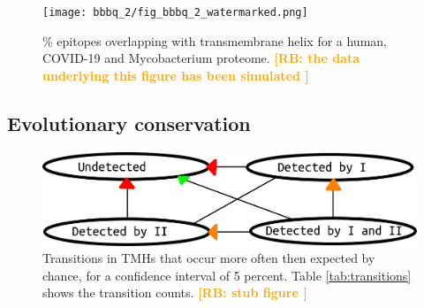 \documentclass{article}
\newcommand{\richel}[1]{\textcolor{orange}{\textbf{[RB: #1]}}}
\begin{document}
\begin{figure}[!htbp]
  \texttt{[image: bbbq\_2/fig\_bbbq\_2\_watermarked.png]}
  \caption{
    \% epitopes overlapping with transmembrane helix
    for a human, COVID-19 and Mycobacterium proteome.
    \richel{
      the data underlying this figure has been simulated
    }
  }
  \label{fig:2}
\end{figure}

\subsection{Evolutionary conservation}

\begin{figure}[!htbp]
  \includegraphics[width=\textwidth]{transitions.png}
  \caption{
    Transitions in TMHs that occur more often then expected by chance,
    for a confidence interval of 5 percent.
    Table \ref{tab:transitions} shows the transition counts.
    \richel{
      stub figure
    }
  }
  \label{fig:transitions}
\end{figure}

\begin{table}[!htbp]
  
  \caption{
    Transitions counts, where the row indicates the source state,
    and the column indicates the target state.
    First number per cell is the observed number of this state transition,
    where the second number is the expected number of this state transition
    as predicted by chance.
    An asterisk behind the observed count indicates that this count
    is unlikely to be caused by chance only.
    Figure \ref{fig:transitions} shows which transition counts are 
    unlikely to be caused by chance only.
  }
  \label{tab:transitions}
\end{table}


\end{document}
